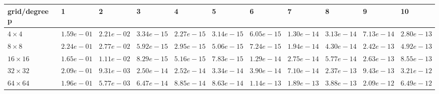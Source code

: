 \begin{tabular}{lllllllllll}
\hline
 grid/degree p   & 1          & 2          & 3          & 4          & 5          & 6          & 7          & 8          & 9          & 10         \\
\hline
 $4 \times 4$    & $1.59e-01$ & $2.21e-02$ & $3.34e-15$ & $2.27e-15$ & $3.14e-15$ & $6.05e-15$ & $1.30e-14$ & $3.13e-14$ & $7.13e-14$ & $2.80e-13$ \\
 $8 \times 8$    & $2.24e-01$ & $2.77e-02$ & $5.92e-15$ & $2.95e-15$ & $5.06e-15$ & $7.24e-15$ & $1.94e-14$ & $4.30e-14$ & $2.42e-13$ & $4.92e-13$ \\
 $16 \times 16$  & $1.65e-01$ & $1.11e-02$ & $8.29e-15$ & $5.16e-15$ & $7.83e-15$ & $1.29e-14$ & $2.75e-14$ & $5.77e-14$ & $2.63e-13$ & $8.55e-13$ \\
 $32 \times 32$  & $2.09e-01$ & $9.31e-03$ & $2.50e-14$ & $2.52e-14$ & $3.34e-14$ & $3.90e-14$ & $7.10e-14$ & $2.37e-13$ & $9.43e-13$ & $3.21e-12$ \\
 $64 \times 64$  & $1.96e-01$ & $5.77e-03$ & $6.47e-14$ & $8.85e-14$ & $8.63e-14$ & $1.14e-13$ & $1.89e-13$ & $3.88e-13$ & $2.09e-12$ & $6.49e-12$ \\
\hline
\end{tabular}